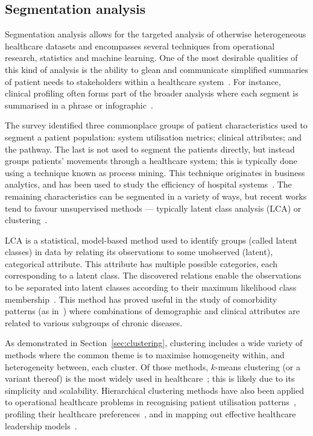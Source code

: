 \subsection{Segmentation analysis}

Segmentation analysis allows for the targeted analysis of otherwise
heterogeneous healthcare datasets and encompasses several techniques from
operational research, statistics and machine learning. One of the most desirable
qualities of this kind of analysis is the ability to glean and communicate
simplified summaries of patient needs to stakeholders within a healthcare
system~\cite{ElDarzi2009,Tomar2013,Vuik2016b,Yoon2020}. For instance, clinical
profiling often forms part of the broader analysis where each segment is
summarised in a phrase or infographic~\cite{Vuik2016a,Yan2019}.

The survey identified three commonplace groups of patient characteristics used
to segment a patient population: system utilisation metrics; clinical
attributes; and the pathway. The last is not used to segment the patients
directly, but instead groups patients' movements through a healthcare system;
this is typically done using a technique known as process mining. This technique
originates in business analytics, and has been used to study the efficiency of
hospital systems~\cite{Arnolds2018,Delias2015}. The remaining characteristics
can be segmented in a variety of ways, but recent works tend to favour
unsupervised methods --- typically latent class analysis (LCA) or
clustering~\cite{Yan2018}.

LCA is a statistical, model-based method used to identify groups (called latent
classes) in data by relating its observations to some unobserved (latent),
categorical attribute. This attribute has multiple possible categories, each
corresponding to a latent class. The discovered relations enable the
observations to be separated into latent classes according to their maximum
likelihood class membership~\cite{Hagenaars2002,Lazarsfeld1968}. This method has
proved useful in the study of comorbidity patterns (as
in~\cite{Kuwornu2014,Larsen2017}) where combinations of demographic and clinical
attributes are related to various subgroups of chronic diseases.

As demonstrated in Section~\ref{sec:clustering}, clustering includes a wide
variety of methods where the common theme is to maximise homogeneity within, and
heterogeneity between, each cluster. Of those methods, \(k\)-means clustering
(or a variant thereof) is the most widely used in
healthcare~\cite{%
    Elbattah2017,Haraty2015,Ogbuabor2018,Santhi2010,Silitonga2018,Vuik2016a%
}; this is likely due to its simplicity and scalability. Hierarchical clustering
methods have also been applied to operational healthcare problems in recognising
patient utilisation patterns~\cite{Zayas2016}, profiling their healthcare
preferences~\cite{Liu2009}, and in mapping out effective healthcare leadership
models~\cite{Hargett2017}.

